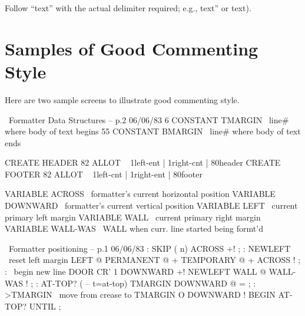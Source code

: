 \noindent Follow ``text'' with the actual delimiter required; e.g., text''
or text).

\section{Samples of Good Commenting Style}

Here are two sample screens to illustrate good commenting
style.

\setcounter{screen}{126}
\begin{Screen}
\ Formatter         Data Structures -- p.2             06/06/83
 6 CONSTANT TMARGIN \ line# where body of text begins
55 CONSTANT BMARGIN \ line# where body of text ends

CREATE HEADER 82 ALLOT
\  { 1left-ent | 1right-cnt | 80header }
CREATE FOOTER 82 ALLOT
\  { 1left-cnt | 1right-ent | 80footer }

VARIABLE ACROSS   \ formatter's current horizontal position
VARIABLE DOWNWARD \ formatter's current vertical position
VARIABLE LEFT     \ current primary left margin
VARIABLE WALL     \ current primary right margin
VARIABLE WALL-WAS \ WALL when curr. line started being formt'd

\end{Screen}

\begin{Screen}
\ Formatter          positioning -- p.1               06/06/83
: SKIP  ( n)  ACROSS +! ;
: NEWLEFT  \ reset left margin
   LEFT @  PERMANENT @ +  TEMPORARY @ +  ACROSS ! ;
: \LINE  \ begin new line
   DOOR  CR'  1 DOWNWARD +!  NEWLEFT  WALL @  WALL-WAS ! ;
: AT-TOP?  ( -- t=at-top)  TMARGIN  DOWNWARD @ = ;
: >TMARGIN  \ move from crease to TMARGIN
   O DOWNWARD !  BEGIN  \LINE  AT-TOP? UNTIL ;

\end{Screen}

